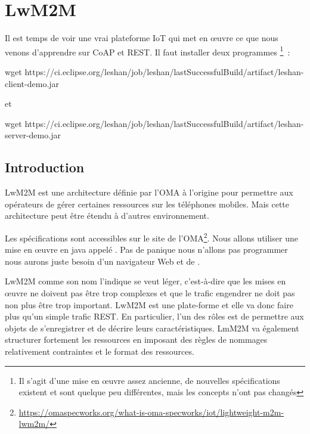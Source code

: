 \cleardoublepage

\chapter{LwM2M}

Il est temps de voir une vrai plateforme IoT qui met en œuvre ce que nous venons d'apprendre sur CoAP et REST. Il faut installer deux programmes \footnote{Il s'agit d'une mise en œuvre assez ancienne, de nouvelles spécifications existent et sont quelque peu différentes, mais les concepts n'ont pas changés}~:

\begin{termc}[backgroundcolor=\color{verttelecom!30}, basicstyle=\ttfamily\tiny, escapechar=@]
wget https://ci.eclipse.org/leshan/job/leshan/lastSuccessfulBuild/artifact/leshan-client-demo.jar
\end{termc}

\noindent et

\begin{termc}[backgroundcolor=\color{verttelecom!30}, basicstyle=\ttfamily\tiny, escapechar=@]
wget https://ci.eclipse.org/leshan/job/leshan/lastSuccessfulBuild/artifact/leshan-server-demo.jar
\end{termc}

\section{Introduction}

\ac{LwM2M} est une architecture définie par l'\ac{OMA} à l'origine pour permettre aux opérateurs de gérer certaines ressources sur les téléphones mobiles. Mais cette architecture peut être étendu à d'autres environnement. 

         \vspace{1em}

Les spécifications sont accessibles sur le site de l'OMA\footnote{\url{https://omaspecworks.org/what-is-oma-specworks/iot/lightweight-m2m-lwm2m/}}. Nous allons utiliser une mise en œuvre en java appelé . Pas de panique nous n'allons pas programmer nous aurons juste besoin d'un navigateur Web et de .

         \vspace{1em}

\ac{LwM2M} comme son nom l'indique se veut léger, c'est-à-dire que les mises en œuvre ne doivent pas être trop complexes et que le trafic engendrer ne doit pas non plus être trop important. LwM2M est une plate-forme et elle va donc faire plus qu'un simple trafic REST. En particulier, l'un des rôles est de permettre aux objets de s'enregistrer et de décrire leurs caractéristiques. LmM2M va également structurer fortement les ressources en imposant des règles de nommages relativement contraintes et le format des ressources.

